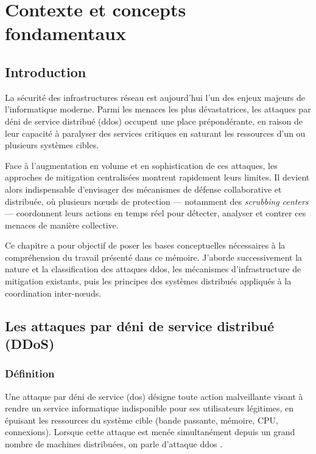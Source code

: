 ﻿%
\chapter{Contexte et concepts fondamentaux}
\label{chap:fondamentaux}

\section{Introduction}

La sécurité des infrastructures réseau est aujourd'hui l'un des enjeux majeurs de l'informatique moderne. Parmi les menaces les plus dévastatrices, les attaques par déni de service distribué (\gls{ddos}) occupent une place prépondérante, en raison de leur capacité à paralyser des services critiques en saturant les ressources d'un ou plusieurs systèmes cibles.

Face à l'augmentation en volume et en sophistication de ces attaques, les approches de mitigation centralisées montrent rapidement leurs limites. Il devient alors indispensable d'envisager des mécanismes de défense collaborative et distribuée, où plusieurs n\oe{}uds de protection --- notamment des \textit{scrubbing centers} --- coordonnent leurs actions en temps réel pour détecter, analyser et contrer ces menaces de manière collective.

Ce chapitre a pour objectif de poser les bases conceptuelles nécessaires à la compréhension du travail présenté dans ce mémoire. J'aborde successivement la nature et la classification des attaques \gls{ddos}, les mécanismes d'infrastructure de mitigation existants, puis les principes des systèmes distribués appliqués à la coordination inter-n\oe{}uds.

\section{Les attaques par déni de service distribué (DDoS)}
\label{sec:ddos}

\subsection{Définition}

Une attaque par déni de service (\gls{dos}) désigne toute action malveillante visant à rendre un service informatique indisponible pour ses utilisateurs légitimes, en épuisant les ressources du système cible (bande passante, mémoire, CPU, connexions). Lorsque cette attaque est menée simultanément depuis un grand nombre de machines distribuées, on parle d'attaque \gls{ddos} \parencite{mirkovic2004taxonomy}.

